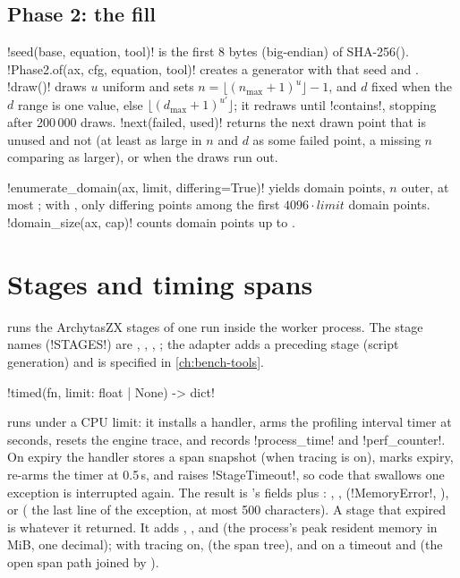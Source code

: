 \subsection{Phase 2: the fill}

\py!seed(base, equation, tool)! is the first 8 bytes (big-endian) of
SHA-256(). \py!Phase2.of(ax, cfg, equation, tool)! creates a generator
with that seed and . \py!draw()! draws $u$ uniform and sets
$n=\lfloor(n_{\max}+1)^u\rfloor-1$, and $d$ fixed when the $d$ range is one value, else
$\lfloor(d_{\max}+1)^{u'}\rfloor$; it redraws until \py!contains!, stopping after 200\,000 draws.
\py!next(failed, used)! returns the next drawn point that is unused and not 
(at least as large in $n$ and $d$ as some failed point, a missing $n$ comparing as larger), or
 when the draws run out.

\py!enumerate_domain(ax, limit, differing=True)! yields domain points, $n$ outer, at most
; with , only differing points among the first $4096\cdot
\mathit{limit}$ domain points. \py!domain_size(ax, cap)! counts domain points up to .

\section{Stages and timing spans}\label{sec:bench-stages}

 runs the ArchytasZX stages of one run inside the worker process.
The stage names (\py!STAGES!) are , , ,
; the adapter adds a preceding  stage (script generation) and is
specified in \cref{ch:bench-tools}.

\begin{signature}
\py!timed(fn, limit: float | None) -> dict!
\end{signature}
\noindent runs  under a CPU limit: it installs a  handler, arms the
profiling interval timer  at  seconds, resets the engine trace,
and records \py!process_time! and \py!perf_counter!. On expiry the handler stores a span snapshot
(when tracing is on), marks expiry, re-arms the timer at 0.5\,s, and raises
\py!StageTimeout!, so code that swallows one exception is interrupted again. The result is
's fields plus : , ,  (\py!MemoryError!,
), or  ( the last line of the exception,
at most 500 characters). A stage that expired is  whatever it returned. It adds
, , and  (the process's peak resident memory in MiB, one
decimal); with tracing on,  (the span tree), and on a timeout
 and  (the open span path joined by \code{/}).

